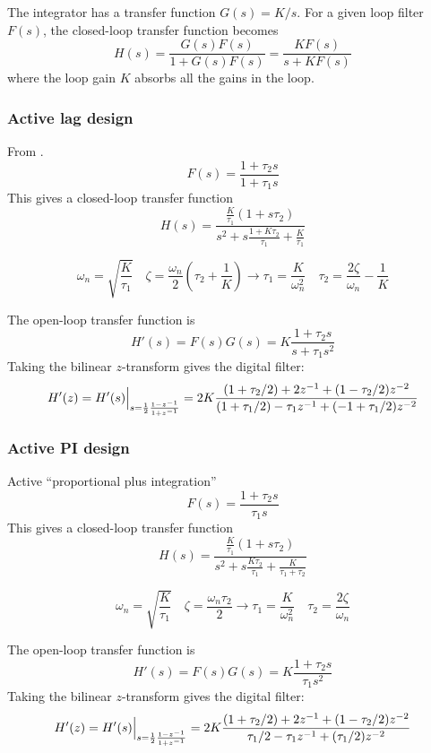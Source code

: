 %
%

The integrator has a transfer function $G(s) = K/s$.
For a given loop filter $F(s)$, the closed-loop transfer function becomes
\[
    H(s) = \frac{ G(s)F(s) }{ 1 + G(s)F(s) }
         = \frac{ KF(s)    }{ s + KF(s)    }
\]
where the loop gain $K$ absorbs all the gains in the loop.

\subsubsection{Active lag design}
From \cite{Best:1997}.
\[
    F(s) = \frac{1 + \tau_2 s}{1 + \tau_1 s}
\]
This gives a closed-loop transfer function
\[
    H(s) = \frac{
                \frac{K}{\tau_1} (1 + s\tau_2)
           } {
                s^2 + s\frac{1 + K\tau_2}{\tau_1} + \frac{K}{\tau_1}
           }
\]

\[
    \omega_n = \sqrt{\frac{K}{\tau_1}}
    \,\,\,\,\,\,
    \zeta = \frac{\omega_n}{2}\left(\tau_2 + \frac{1}{K}\right)
        \rightarrow
    \tau_1 = \frac{K}{\omega_n^2}
    \,\,\,\,\,\,
    \tau_2 = \frac{2\zeta}{\omega_n} - \frac{1}{K}
\]

The open-loop transfer function is
\[
    H'(s) = F(s)G(s) = K \frac{1 + \tau_2 s}{s + \tau_1 s^2}
\]
Taking the bilinear $z$-transform gives the digital filter:
\[
    H'(z) = H'(s)\Bigl.\Bigr|_{s = \frac{1}{2}\frac{1-z^{-1}}{1+z^{-1}}}
          = 2 K \frac{
                (1+\tau_2/2) + 2 z^{-1}     + ( 1 - \tau_2/2)z^{-2}
          } {
                (1+\tau_1/2) -\tau_1 z^{-1} + (-1 + \tau_1/2)z^{-2}
          }
\]



\subsubsection{Active PI design}
Active ``proportional plus integration''
\[
    F(s) = \frac{1 + \tau_2 s}{\tau_1 s}
\]
This gives a closed-loop transfer function
\[
    H(s) = \frac{
                \frac{K}{\tau_1} (1 + s\tau_2)
           } {
                s^2 + s\frac{K\tau_2}{\tau_1} + \frac{K}{\tau_1 + \tau_2}
           }
\]

\[
    \omega_n = \sqrt{\frac{K}{\tau_1}}
    \,\,\,\,\,\,
    \zeta = \frac{\omega_n \tau_2}{2}
        \rightarrow
    \tau_1 = \frac{K}{\omega_n^2}
    \,\,\,\,\,\,
    \tau_2 = \frac{2\zeta}{\omega_n}
\]

The open-loop transfer function is
\[
    H'(s) = F(s)G(s) = K \frac{1 + \tau_2 s}{\tau_1 s^2}
\]
Taking the bilinear $z$-transform gives the digital filter:
\[
    H'(z) = H'(s)\Bigl.\Bigr|_{s = \frac{1}{2}\frac{1-z^{-1}}{1+z^{-1}}}
          = 2 K \frac{
                (1+\tau_2/2) + 2 z^{-1}     + ( 1 - \tau_2/2)z^{-2}
          } {
                \tau_1/2 -\tau_1 z^{-1} + (\tau_1/2)z^{-2}
          }
\]

